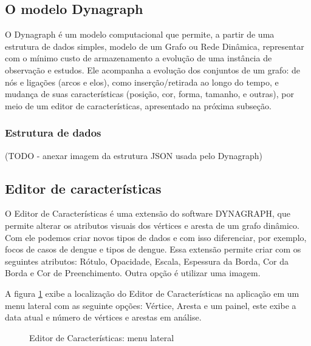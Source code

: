 \subsection{O modelo Dynagraph}

O Dynagraph \cite{dynagraph} é um modelo computacional que permite, a partir de uma estrutura de dados simples, modelo de um Grafo ou Rede Dinâmica, representar com o mínimo custo de armazenamento a evolução de uma instância de observação e estudos. Ele acompanha a evolução dos conjuntos de um grafo: de nós e ligações (arcos e elos), como inserção/retirada ao longo do tempo, e mudança de suas características (posição, cor, forma, tamanho, e outras), por meio de um editor de características, apresentado na próxima subseção.

\subsubsection{Estrutura de dados}

(TODO - anexar imagem da estrutura JSON usada pelo Dynagraph)

\subsection{Editor de características}
O Editor de Características é uma extensão do software DYNAGRAPH, que permite alterar os atributos visuais dos vértices e aresta de um grafo dinâmico.
Com ele podemos criar novos tipos de dados e com isso diferenciar, por exemplo, focos de casos de dengue e tipos de dengue.
Essa extensão permite criar com os seguintes atributos: Rótulo, Opacidade, Escala, Espessura da Borda, Cor da Borda e Cor de Preenchimento. Outra opção é utilizar uma imagem.
 
A figura \ref{fig:edCaMenu} exibe a localização do Editor de Características na aplicação em um menu lateral com as seguinte opções: Vértice, Aresta e um painel, este exibe a data atual e número de vértices e arestas em análise.
\begin{figure}[!h]
	\centering	
	\caption{\label{fig:edCaMenu} Editor de Características: menu lateral}
\end{figure}
\FloatBarrier

